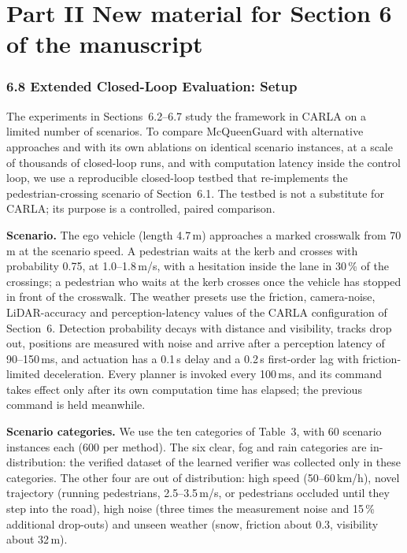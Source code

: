 \documentclass[11pt]{article}
\begin{document}
\clearpage
\part*{Part II \quad New material for Section 6 of the manuscript}
\setcounter{table}{5}
\setcounter{figure}{17}

\section*{6.8 \quad Extended Closed-Loop Evaluation: Setup}
The experiments in Sections~6.2--6.7 study the framework in CARLA on a limited number of scenarios. To compare McQueenGuard with
alternative approaches and with its own ablations on identical scenario instances, at a scale of thousands of closed-loop runs, and
with computation latency inside the control loop, we use a reproducible closed-loop testbed that re-implements the
pedestrian-crossing scenario of Section~6.1. The testbed is not a substitute for CARLA; its purpose is a controlled, paired
comparison.

\textbf{Scenario.} The ego vehicle (length 4.7\,m) approaches a marked crosswalk from 70\,m at the scenario speed. A pedestrian waits at
the kerb and crosses with probability 0.75, at 1.0--1.8\,m/s, with a hesitation inside the lane in 30\,\% of the crossings; a
pedestrian who waits at the kerb crosses once the vehicle has stopped in front of the crosswalk. The weather presets use the friction,
camera-noise, LiDAR-accuracy and perception-latency values of the CARLA configuration of Section~6. Detection probability decays with
distance and visibility, tracks drop out, positions are measured with noise and arrive after a perception latency of 90--150\,ms, and
actuation has a 0.1\,s delay and a 0.2\,s first-order lag with friction-limited deceleration. Every planner is invoked every 100\,ms,
and its command takes effect only after its own computation time has elapsed; the previous command is held meanwhile.

\textbf{Scenario categories.} We use the ten categories of Table~3, with 60 scenario instances each (600 per method). The six
clear, fog and rain categories are in-distribution: the verified dataset of the learned verifier was collected only in these
categories. The other four are out of distribution: high speed (50--60\,km/h), novel trajectory (running pedestrians, 2.5--3.5\,m/s, or
pedestrians occluded until they step into the road), high noise (three times the measurement noise and 15\,\% additional
drop-outs) and unseen weather (snow, friction about 0.3, visibility about 32\,m).
\end{document}
